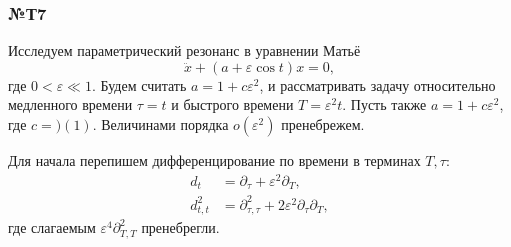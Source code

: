 \subsubsection*{№Т7}


Исследуем параметрический резонанс в уравнении Матьё
\begin{equation*}
    \ddot{x} + (a + \varepsilon \cos t) x = 0,
\end{equation*}
где $0 < \varepsilon \ll 1$. Будем считать $a = 1 + c \varepsilon^2$, и рассматривать задачу относительно медленного времени $\tau = t$ и быстрого времени $T = \varepsilon^2 t$. Пусть также $a = 1 + c \varepsilon^2$, где $c = )(1)$. Величинами порядка $o(\varepsilon^2)$ пренебрежем.

Для начала перепишем дифференцирование по времени в терминах $T, \tau$:
\begin{align*}
    d_t &= \partial_\tau + \varepsilon^2 \partial_T, \\
    d^2_{t, t} &= 
    \partial^2_{\tau, \tau} + 2 \varepsilon^2 \partial_\tau \partial_T,
\end{align*}
где слагаемым $\varepsilon^4 \partial^2_{T, T}$ пренебрегли. 

